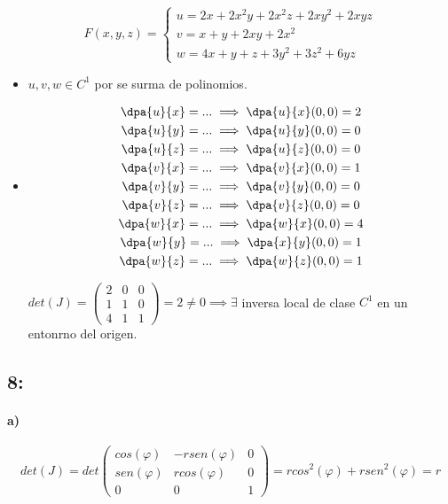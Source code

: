 \documentclass{apuntes}
\begin{document}
$$F(x,y,z) = \left\{\begin{matrix}u = 2x+2x^2y+2x^2z+2xy^2+2xyz\\v=x+y+2xy+2x^2\\w=4x+y+z+3y^2+3z^2+6yz\end{matrix}\right.$$
\begin{itemize}
 \item $u,v,w \in C^1$ por se surma de polinomios. 
 \item \begin{gather*}
\dpa{u}{x} = ... \implies \dpa{u}{x}(0,0) = 2\\
\dpa{u}{y} = ... \implies \dpa{u}{y}(0,0) = 0\\
\dpa{u}{z} = ... \implies \dpa{u}{z}(0,0) = 0\\
\dpa{v}{x} = ... \implies \dpa{v}{x}(0,0) = 1\\
\dpa{v}{y} = ... \implies \dpa{v}{y}(0,0) = 0\\
\dpa{v}{z} = ... \implies \dpa{v}{z}(0,0) = 0\\
\dpa{w}{x} = ... \implies \dpa{w}{x}(0,0) = 4\\
\dpa{w}{y} = ... \implies \dpa{x}{y}(0,0) = 1\\
\dpa{w}{z} = ... \implies \dpa{w}{z}(0,0) = 1
       \end{gather*}
       
   $det(J) =\begin{pmatrix}
             2&0&0\\
             1&1&0\\
             4&1&1
            \end{pmatrix}
 = 2 \neq 0 \implies \exists $ inversa local de clase $C^1$ en un entonrno del origen.
\end{itemize}

\subsection{8:}
\paragraph{a)}

$$det(J) = det\begin{pmatrix}
       cos(\varphi)&-rsen(\varphi)&0\\
       sen(\varphi)&rcos(\varphi)&0\\
       0&0&1
      \end{pmatrix} = rcos^2(\varphi) + rsen^2(\varphi) = r$$
      
\end{document}
